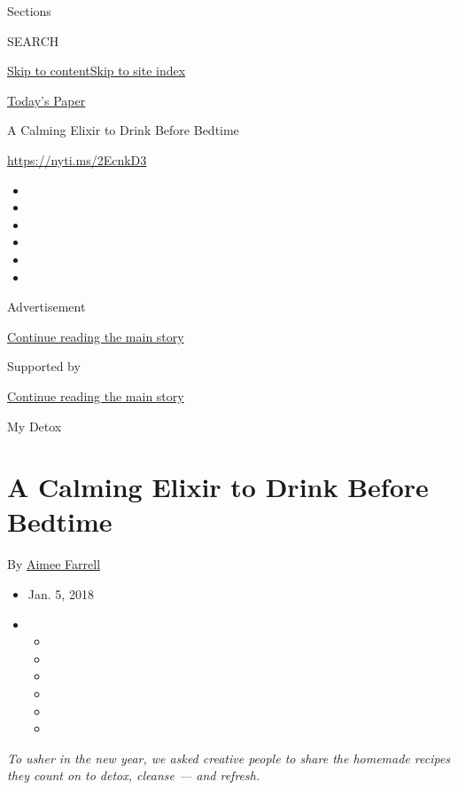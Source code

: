 Sections

SEARCH

\protect\hyperlink{site-content}{Skip to
content}\protect\hyperlink{site-index}{Skip to site index}

\href{https://myaccount.nytimes3xbfgragh.onion/auth/login?response_type=cookie\&client_id=vi}{}

\href{https://www.nytimes3xbfgragh.onion/section/todayspaper}{Today's
Paper}

A Calming Elixir to Drink Before Bedtime

\url{https://nyti.ms/2EcnkD3}

\begin{itemize}
\item
\item
\item
\item
\item
\item
\end{itemize}

Advertisement

\protect\hyperlink{after-top}{Continue reading the main story}

Supported by

\protect\hyperlink{after-sponsor}{Continue reading the main story}

My Detox

\hypertarget{a-calming-elixir-to-drink-before-bedtime}{%
\section{A Calming Elixir to Drink Before
Bedtime}\label{a-calming-elixir-to-drink-before-bedtime}}

By \href{https://www.nytimes3xbfgragh.onion/by/aimee-farrell}{Aimee
Farrell}

\begin{itemize}
\item
  Jan. 5, 2018
\item
  \begin{itemize}
  \item
  \item
  \item
  \item
  \item
  \item
  \end{itemize}
\end{itemize}

\emph{To usher in the new year, we asked creative people to share the
homemade recipes they count on to detox, cleanse --- and refresh.}

